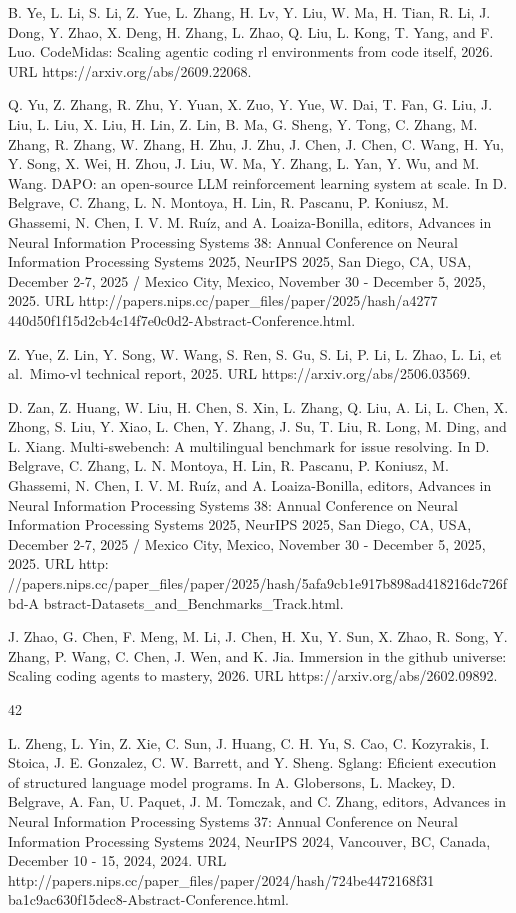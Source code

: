 \documentclass[
  10
]{article}
\begin{document}
B. Ye, L. Li, S. Li, Z. Yue, L. Zhang, H. Lv, Y. Liu, W. Ma, H. Tian, R.
Li, J. Dong, Y. Zhao, X. Deng, H. Zhang, L. Zhao, Q. Liu, L. Kong, T.
Yang, and F. Luo. CodeMidas: Scaling agentic coding rl environments from
code itself, 2026. URL https://arxiv.org/abs/2609.22068.

Q. Yu, Z. Zhang, R. Zhu, Y. Yuan, X. Zuo, Y. Yue, W. Dai, T. Fan, G.
Liu, J. Liu, L. Liu, X. Liu, H. Lin, Z. Lin, B. Ma, G. Sheng, Y. Tong,
C. Zhang, M. Zhang, R. Zhang, W. Zhang, H. Zhu, J. Zhu, J. Chen, J.
Chen, C. Wang, H. Yu, Y. Song, X. Wei, H. Zhou, J. Liu, W. Ma, Y. Zhang,
L. Yan, Y. Wu, and M. Wang. DAPO: an open-source LLM reinforcement
learning system at scale. In D. Belgrave, C. Zhang, L. N. Montoya, H.
Lin, R. Pascanu, P. Koniusz, M. Ghassemi, N. Chen, I. V. M. Ruíz, and A.
Loaiza-Bonilla, editors, Advances in Neural Information Processing
Systems 38: Annual Conference on Neural Information Processing Systems
2025, NeurIPS 2025, San Diego, CA, USA, December 2-7, 2025 / Mexico
City, Mexico, November 30 - December 5, 2025, 2025. URL
http://papers.nips.cc/paper\_files/paper/2025/hash/a4277
440d50f1f15d2cb4c14f7e0c0d2-Abstract-Conference.html.

Z. Yue, Z. Lin, Y. Song, W. Wang, S. Ren, S. Gu, S. Li, P. Li, L. Zhao,
L. Li, et al.~Mimo-vl technical report, 2025. URL
https://arxiv.org/abs/2506.03569.

D. Zan, Z. Huang, W. Liu, H. Chen, S. Xin, L. Zhang, Q. Liu, A. Li, L.
Chen, X. Zhong, S. Liu, Y. Xiao, L. Chen, Y. Zhang, J. Su, T. Liu, R.
Long, M. Ding, and L. Xiang. Multi-swebench: A multilingual benchmark
for issue resolving. In D. Belgrave, C. Zhang, L. N. Montoya, H. Lin, R.
Pascanu, P. Koniusz, M. Ghassemi, N. Chen, I. V. M. Ruíz, and A.
Loaiza-Bonilla, editors, Advances in Neural Information Processing
Systems 38: Annual Conference on Neural Information Processing Systems
2025, NeurIPS 2025, San Diego, CA, USA, December 2-7, 2025 / Mexico
City, Mexico, November 30 - December 5, 2025, 2025. URL http:
//papers.nips.cc/paper\_files/paper/2025/hash/5afa9cb1e917b898ad418216dc726fbd-A
bstract-Datasets\_and\_Benchmarks\_Track.html.

J. Zhao, G. Chen, F. Meng, M. Li, J. Chen, H. Xu, Y. Sun, X. Zhao, R.
Song, Y. Zhang, P. Wang, C. Chen, J. Wen, and K. Jia. Immersion in the
github universe: Scaling coding agents to mastery, 2026. URL
https://arxiv.org/abs/2602.09892.

42

L. Zheng, L. Yin, Z. Xie, C. Sun, J. Huang, C. H. Yu, S. Cao, C.
Kozyrakis, I. Stoica, J. E. Gonzalez, C. W. Barrett, and Y. Sheng.
Sglang: Eficient execution of structured language model programs. In A.
Globersons, L. Mackey, D. Belgrave, A. Fan, U. Paquet, J. M. Tomczak,
and C. Zhang, editors, Advances in Neural Information Processing Systems
37: Annual Conference on Neural Information Processing Systems 2024,
NeurIPS 2024, Vancouver, BC, Canada, December 10 - 15, 2024, 2024. URL
http://papers.nips.cc/paper\_files/paper/2024/hash/724be4472168f31
ba1c9ac630f15dec8-Abstract-Conference.html.
\end{document}
